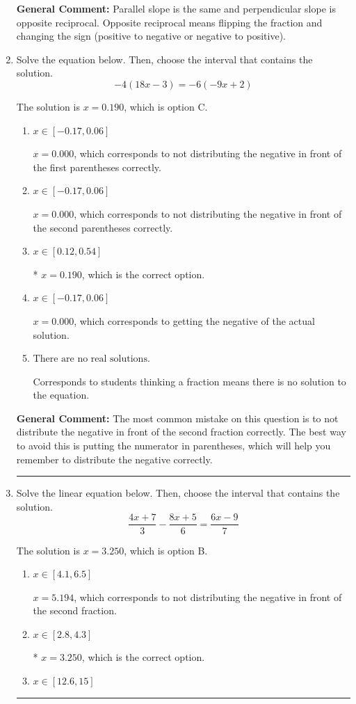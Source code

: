 \documentclass{extbook}[14pt]
\newcommand{\litem}[1]{\item #1

\rule{\textwidth}{0.4pt}}
\begin{document}
\begin{enumerate}
{\textbf{General Comment:} Parallel slope is the same and perpendicular slope is opposite reciprocal. Opposite reciprocal means flipping the fraction and changing the sign (positive to negative or negative to positive).
}
\litem{
Solve the equation below. Then, choose the interval that contains the solution.
\[ -4(18x -3) = -6(-9x + 2) \]

The solution is \( x = 0.190 \), which is option C.\begin{enumerate}[label=\Alph*.]
\item \( x \in [-0.17, 0.06] \)

$x = 0.000$, which corresponds to not distributing the negative in front of the first parentheses correctly.
\item \( x \in [-0.17, 0.06] \)

$x = 0.000$, which corresponds to not distributing the negative in front of the second parentheses correctly.
\item \( x \in [0.12, 0.54] \)

* $x = 0.190$, which is the correct option.
\item \( x \in [-0.17, 0.06] \)

$x = 0.000$, which corresponds to getting the negative of the actual solution.
\item \( \text{There are no real solutions.} \)

Corresponds to students thinking a fraction means there is no solution to the equation.
\end{enumerate}

\textbf{General Comment:} The most common mistake on this question is to not distribute the negative in front of the second fraction correctly. The best way to avoid this is putting the numerator in parentheses, which will help you remember to distribute the negative correctly.
}
\litem{
Solve the linear equation below. Then, choose the interval that contains the solution.
\[ \frac{4x + 7}{3} - \frac{8x + 5}{6} = \frac{6x -9}{7} \]

The solution is \( x = 3.250 \), which is option B.\begin{enumerate}[label=\Alph*.]
\item \( x \in [4.1, 6.5] \)

 $x = 5.194$, which corresponds to not distributing the negative in front of the second fraction.
\item \( x \in [2.8, 4.3] \)

* $x = 3.250$, which is the correct option.
\item \( x \in [12.6, 15] \)


\end{enumerate}}
\end{enumerate}
\end{document}
